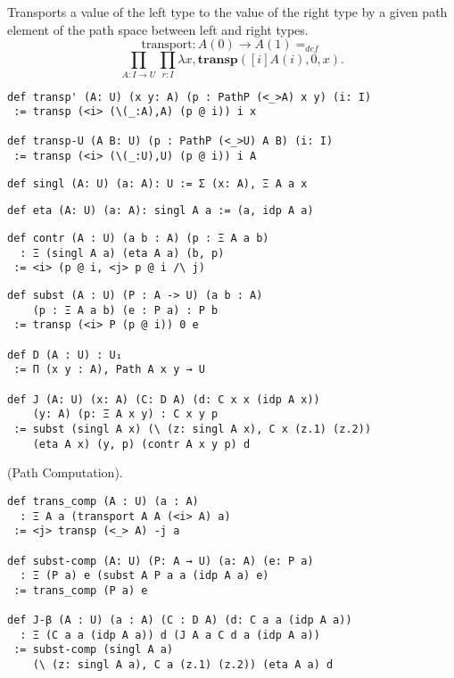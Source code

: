 \documentclass{article}
\begin{document}
\begin{theorem}
Transports a value of the left type to the value of the right type
by a given path element of the path space between left and right types.
$$
  \mathrm{transport} : A(0) \rightarrow A(1) =_{def}
$$
$$
   \prod_{A:I\rightarrow U}\prod_{r:I} \lambda x,\mathbf{transp}([i]A(i),0,x).
$$
\begin{lstlisting}
def transp' (A: U) (x y: A) (p : PathP (<_>A) x y) (i: I)
 := transp (<i> (\(_:A),A) (p @ i)) i x

def transp-U (A B: U) (p : PathP (<_>U) A B) (i: I)
 := transp (<i> (\(_:U),U) (p @ i)) i A
\end{lstlisting}
\end{theorem}

\begin{definition}[Singleton]
\begin{lstlisting}
def singl (A: U) (a: A): U := Σ (x: A), Ξ A a x
\end{lstlisting}
\end{definition}

\begin{theorem}
\begin{lstlisting}
def eta (A: U) (a: A): singl A a := (a, idp A a)
\end{lstlisting}
\end{theorem}

\begin{theorem}
\begin{lstlisting}
def contr (A : U) (a b : A) (p : Ξ A a b)
  : Ξ (singl A a) (eta A a) (b, p)
 := <i> (p @ i, <j> p @ i /\ j)
\end{lstlisting}
\end{theorem}

\begin{theorem}
\begin{lstlisting}
def subst (A : U) (P : A -> U) (a b : A)
    (p : Ξ A a b) (e : P a) : P b
 := transp (<i> P (p @ i)) 0 e

def D (A : U) : U₁
 := Π (x y : A), Path A x y → U

def J (A: U) (x: A) (C: D A) (d: C x x (idp A x))
    (y: A) (p: Ξ A x y) : C x y p
 := subst (singl A x) (\ (z: singl A x), C x (z.1) (z.2))
    (eta A x) (y, p) (contr A x y p) d
\end{lstlisting}
\end{theorem}

\begin{theorem} (Path Computation).
\begin{lstlisting}
def trans_comp (A : U) (a : A)
  : Ξ A a (transport A A (<i> A) a)
 := <j> transp (<_> A) -j a

def subst-comp (A: U) (P: A → U) (a: A) (e: P a)
  : Ξ (P a) e (subst A P a a (idp A a) e)
 := trans_comp (P a) e

def J-β (A : U) (a : A) (C : D A) (d: C a a (idp A a))
  : Ξ (C a a (idp A a)) d (J A a C d a (idp A a))
 := subst-comp (singl A a)
    (\ (z: singl A a), C a (z.1) (z.2)) (eta A a) d
\end{lstlisting}
\end{theorem}
\end{document}
